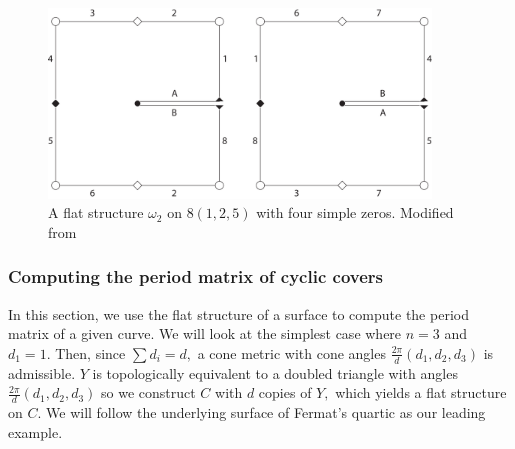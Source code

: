 \documentclass[12pt,reqno]{amsart}
\theoremstyle{definition}
\theoremstyle{remark}
\newtheorem*{remark}{Remark}
\begin{document}
\begin{figure}[htbp]
   \centering
   \includegraphics[width=4in]{figures/flat_rs2.pdf} 
  \caption{A flat structure $\omega_2$ on $8(1, 2, 5)$ with four simple zeros. Modified from \cite{dthesis}}
  \label{fig:flat_rs2}
\end{figure}




\subsubsection*{Computing the period matrix of cyclic covers}
\label{sec:cyclicperiod}
In this section, we use the flat structure of a surface to compute the period matrix of a given curve. We will look at the simplest case where $n = 3$ and $d_1 = 1.$ Then, since $\sum d_i = d,$ a cone metric with cone angles $\frac{2 \pi}{d}(d_1, d_2, d_3)$ is admissible. $Y$ is topologically equivalent to a doubled triangle with angles $\frac{2 \pi}{d}(d_1, d_2, d_3)$ so we construct $C$ with $d$ copies of $Y,$ which yields a flat structure on $C.$  We will follow the underlying surface of Fermat's quartic as our leading example.
\end{document}
